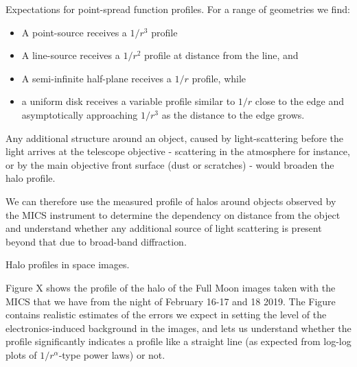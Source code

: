 \documentclass[final,hyperref={pdfpagelabels=false}]{beamer}
\begin{document}
\begin{frame}[t]
\begin{columns}[t]
\begin{column}{.23\textwidth}
\begin{block}{Expectations for point-spread function profiles.}
For a range of geometries we find:
\begin{itemize}
    \item A point-source receives a $1/r^3$ profile
    \item A line-source receives a $1/r^2$ profile at distance from the line, and
    \item A semi-infinite half-plane receives a $1/r$ profile, while
    \item a uniform disk receives a variable profile similar to $1/r$ close to the edge and asymptotically approaching $1/r^3$ as the distance to the edge grows.
\end{itemize}

Any additional structure around an object, caused by light-scattering before the light arrives at the telescope objective - scattering in  the atmosphere for instance, or by the main objective front surface (dust or scratches) - would broaden the halo profile.

We can therefore use the measured profile of halos around objects observed by the MICS instrument to determine the dependency on distance from the object and understand whether any additional source of light scattering is present beyond that due to broad-band diffraction. 

\end{block}

\begin{block}{Halo profiles in space images.}

Figure X shows the profile of the halo of the Full Moon images taken with the MICS that we have from the night of February 16-17 and 18 2019. The Figure contains realistic estimates of the errors we expect in setting the level of the electronics-induced background in the images, and lets us understand whether the profile significantly indicates a profile like a straight line (as expected from log-log plots of $1/r^{\alpha}$-type power laws) or not.


\end{block}
\end{column}
\end{columns}
\end{frame}
\end{document}
